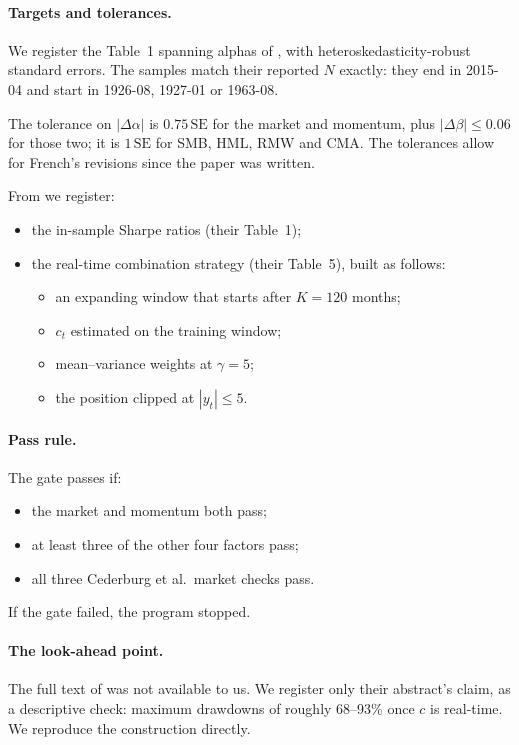 \documentclass[11pt]{article}
\begin{document}
\paragraph{Targets and tolerances.} We register the Table~1 spanning alphas
of \citet{moreira2017}, with heteroskedasticity-robust standard errors. The
samples match their reported $N$ exactly: they end in 2015-04 and start in
1926-08, 1927-01 or 1963-08.

The tolerance on $|\Delta\alpha|$ is $0.75\,\mathrm{SE}$ for the market and
momentum, plus $|\Delta\beta|\le0.06$ for those two; it is
$1\,\mathrm{SE}$ for SMB, HML, RMW and CMA. The tolerances allow for French's
revisions since the paper was written.

From \citet{cederburg2020} we register:
\begin{itemize}
\item the in-sample Sharpe ratios (their Table~1);
\item the real-time combination strategy (their Table~5), built as follows:
  \begin{itemize}
  \item an expanding window that starts after $K=120$ months;
  \item $c_t$ estimated on the training window;
  \item mean--variance weights at $\gamma=5$;
  \item the position clipped at $|y_t|\le5$.
  \end{itemize}
\end{itemize}

\paragraph{Pass rule.} The gate passes if:
\begin{itemize}
\item the market and momentum both pass;
\item at least three of the other four factors pass;
\item all three Cederburg et al.\ market checks pass.
\end{itemize}
If the gate failed, the program stopped.

\paragraph{The look-ahead point.} The full text of \citet{liu2019} was not
available to us. We register only their abstract's claim, as a descriptive
check: maximum drawdowns of roughly 68--93\% once $c$ is real-time. We
reproduce the construction directly.
\end{document}
